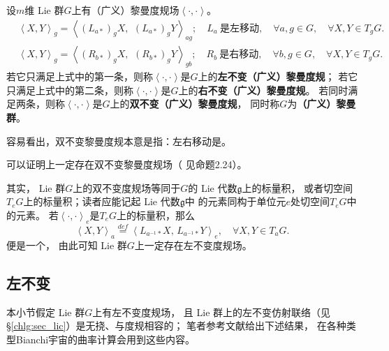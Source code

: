 \begin{definition}
    设$m$维 Lie 群$G$上有（广义）黎曼度规场$\left<\cdot,\cdot \right>$。
    \begin{align*}
        &\left<X,Y\right>_{g} = \left<(L_{a*})_g X,\,\ (L_{a*})_g Y \right>_{ag};
        \quad L_{a} \  \text{是左移动},\quad \forall a,g\in G, \quad \forall X,Y \in T_g G. \\
        &\left<X,Y\right>_{g} = \left<(R_{b*})_g X,\,\ (R_{b*})_g Y \right>_{gb};
        \quad R_{b} \  \text{是右移动} ,\quad \forall b,g\in G, \quad \forall X,Y \in T_g G. 
    \end{align*}
    若它只满足上式中的第一条，则称$\left<\cdot,\cdot \right>$是$G$上的\textbf{左不变（广义）黎曼度规}；
    若它只满足上式中的第二条，则称$\left<\cdot,\cdot \right>$是$G$上的\textbf{右不变（广义）黎曼度规}。
    若同时满足两条，则称$\left<\cdot,\cdot \right>$是$G$上的\textbf{双不变（广义）黎曼度规}，
    同时称$G$为\textbf{（广义）黎曼群}。
\end{definition}
容易看出，双不变黎曼度规本意是指：左右移动是。


可以证明上一定存在双不变黎曼度规场（ 见\parencite[\S 2.2]{Alexandrino-2015}命题2.24）。

其实， Lie 群$G$上的双不变度规场等同于$G$的 Lie 代数$\mathfrak{g}$上的标量积，
或者切空间$T_e G$上的标量积；读者应能记起 Lie 代数$\mathfrak{g}$中
的元素同构于单位元$e$处切空间$T_e G$中的元素。
若$\left<\cdot,\cdot \right>_e$是$T_e G$上的标量积，那么
\begin{equation}\label{chlg:eqn_left-invariant-metric}
    \left<X,Y\right>_a \overset{def}{=} 
    \left<L_{a^{-1}*} X,\, L_{a^{-1}*} Y \right>_e, 
    \quad \forall X,Y \in T_a G.
\end{equation}
便是一个，
由此可知 Lie 群$G$上一定存在左不变度规场。

\subsection{左不变}
本小节假定 Lie 群$G$上有左不变度规场，
且 Lie 群上的左不变仿射联络（见\S\ref{chlg:sec_lic}）是无挠、与度规相容的；
笔者参考文献\parencite{Milnor-1976}给出下述结果，
在各种类型Bianchi宇宙的曲率计算会用到这些内容。






